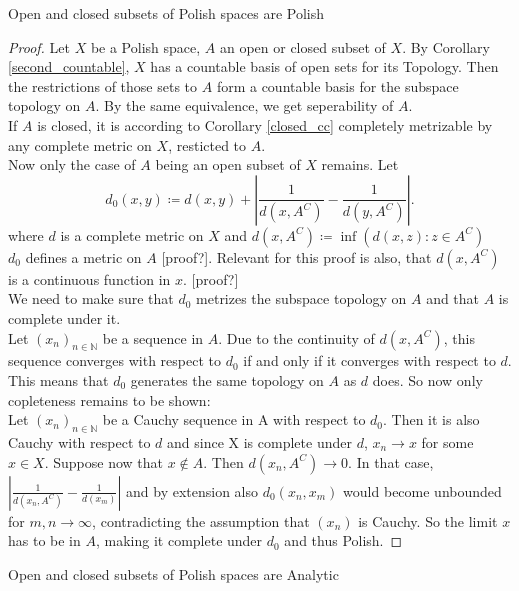 \documentclass[10pt, a4paper, titlepage]{article}
\numberwithin{equation}{section}
\begin{document}
\begin{corollary}
	Open and closed subsets of Polish spaces are Polish
\end{corollary}
\begin{proof}
	Let $X$ be a Polish space, $A$ an open or closed subset of $X$.
	By Corollary \ref{second_countable}, $X$ has a countable basis of open sets for its Topology. Then the restrictions of those sets to  $A$ form  a countable basis for the subspace topology on $A$. 
By the same equivalence, we get seperability of  $A$.\\
If $A$ is closed, it is according to Corollary \ref{closed_cc} completely metrizable by any complete metric on $X$, resticted to  $A$.\\
Now only the case of  $A$ being an open subset of  $X$ remains.
Let  \[
d_0 \left( x,y \right)  \coloneq d\left( x,y \right) + \left| \frac{1}{d\left( x,A^{C} \right) } - \frac{1}{d\left( y,A^C \right) } \right| 
.\]
where $d$ is a complete metric on  $X$ and  $d\left( x,A^C \right)  \coloneq \inf\left( d\left( x,z \right): z \in A^C \right)  $\\
$d_0$ defines a metric on $A$ [proof?]. Relevant for this proof is also, that $d\left( x,A^C \right) $ is a continuous function in $x$. [proof?]\\
We need to make sure that $d_0$ metrizes the subspace topology on $A$ and that  $A$ is complete under it.\\
Let $\left( x_{n} \right)_{n \in \mathbb{N}}$ be a sequence in $A$. Due to the continuity of  $d\left( x,A^C \right) $, this sequence converges with respect to $d_0$ if and only if it converges with respect to $d$. This means that $d_0$ generates the same topology on $A$ as  $d$ does. So now only copleteness remains to be shown: \\
Let $(x_{n})_{n \in  \mathbb{N}} $ be a Cauchy sequence in A with respect to $d_0$. Then it is also Cauchy with respect to $d$ and since X is complete under  $d$, $x_{n} \to x$ for some $x \in X$. 
Suppose now that $x \notin A$. Then  $d\left( x_{n},A^{C} \right) \to 0$. In that case, $\left| \frac{1}{d\left( x_{n},A^C \right) }- \frac{1}{d\left( x_m \right) } \right| $ and by extension also $d_0\left( x_{n},x_m \right) $ would become unbounded for $m,n \to \infty$, contradicting the assumption that $\left( x_{n} \right) $ is Cauchy. 
So the limit $x$ has to be in  $A$, making it complete under $d_0$ and thus Polish. 
\end{proof}


\begin{theorem}
	Open and closed subsets of Polish spaces are Analytic
\end{theorem}
\end{document}
